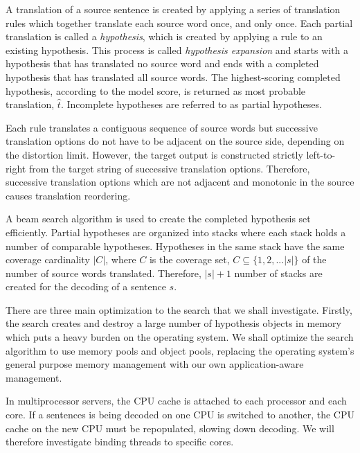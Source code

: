 \documentclass[11pt]{article}
\begin{document}
A translation of a source sentence is created by applying a series of translation rules which together translate each source word once, and only once. Each partial translation is called a \emph{hypothesis}, which is created by applying a rule to an existing hypothesis. This process is called \emph{hypothesis expansion} and starts with a hypothesis that has translated no source word and ends with a completed hypothesis that has translated all source words. The highest-scoring completed hypothesis, according to the model score, is returned as  most probable translation, $\hat{t} $. Incomplete hypotheses are referred to as partial hypotheses.

Each rule translates a contiguous sequence of source words but successive translation options do not have to be adjacent on the source side, depending on the distortion limit. However, the target output is constructed strictly left-to-right from the target string of successive translation options. Therefore, successive translation options which are not adjacent and monotonic in the source causes translation reordering.

A beam search algorithm is used to create the completed hypothesis set efficiently. Partial hypotheses are organized into stacks where each stack holds a number of comparable hypotheses. Hypotheses in the same stack have the same coverage cardinality $|C|$, where $C$ is  the coverage set, $C \subseteq \{1,2,... |s| \} $ of the number of  source words translated. Therefore, $|s| + 1$ number of stacks are created for the decoding of a sentence $s$. 

There are three main optimization to the search that we shall investigate. Firstly, the search creates and destroy a large number of hypothesis objects in memory which puts a heavy burden on the operating system. We shall optimize the search algorithm to use memory pools and object pools, replacing the operating system's general purpose memory management with our own application-aware management. 


In multiprocessor servers, the CPU cache is attached to each processor and each core. If a sentences is being decoded on one CPU is switched to another, the CPU cache on the new CPU must be repopulated, slowing down decoding. We will therefore investigate binding threads to specific cores.
\end{document}
